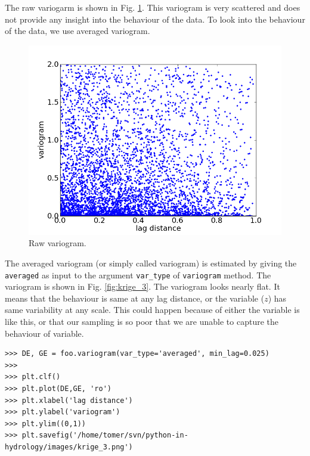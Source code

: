 \documentclass[10pt]{book}
\begin{document}
The raw variogarm is shown in Fig. \ref{fig:krige_2}. This variogram is very scattered and does not provide any insight into the behaviour of the data. To look into the behaviour of the data, we use averaged variogram. 

\beforefig
\begin{figure}[h!]
  \centering
    \includegraphics[scale=0.5]{images/krige_2.png}
  \caption{Raw variogram.}
   \label{fig:krige_2}
\end{figure}
\afterfig

The averaged variogram (or simply called variogram) is estimated by giving the \verb"averaged" as input to the argument \verb"var_type" of \verb"variogram" method. The variogram is shown in Fig. \ref{fig:krige_3}. The variogram looks nearly flat. It means that the behaviour is same at any lag distance, or the variable ($z$) has same variability at any scale. This could happen because of either the variable is like this, or that our sampling is so poor that we are unable to capture the behaviour of variable. 

\beforeverb \begin{verbatim}
>>> DE, GE = foo.variogram(var_type='averaged', min_lag=0.025)
>>> 
>>> plt.clf()
>>> plt.plot(DE,GE, 'ro')
>>> plt.xlabel('lag distance')
>>> plt.ylabel('variogram')
>>> plt.ylim((0,1))
>>> plt.savefig('/home/tomer/svn/python-in-hydrology/images/krige_3.png')
\end{verbatim} \afterverb
\end{document}
